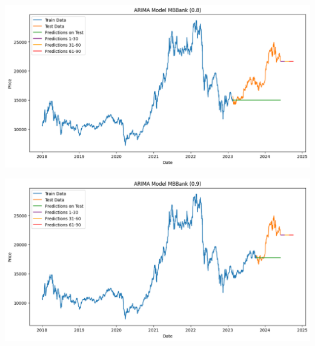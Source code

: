 \documentclass[conference]{IEEEtran}
\begin{document}
\begin{minipage}{0.23\textwidth}
    \centering
    \includegraphics[width=\linewidth]{images/ARIMA/ARIMA_MBB_82.png}
    \label{fig:image1}
\end{minipage}
\hfill
\begin{minipage}{0.23\textwidth}
    \centering
    \includegraphics[width=\linewidth]{images/ARIMA/ARIMA_MBB_91.png}
    \label{fig:image2}
\end{minipage}
\end{document}
